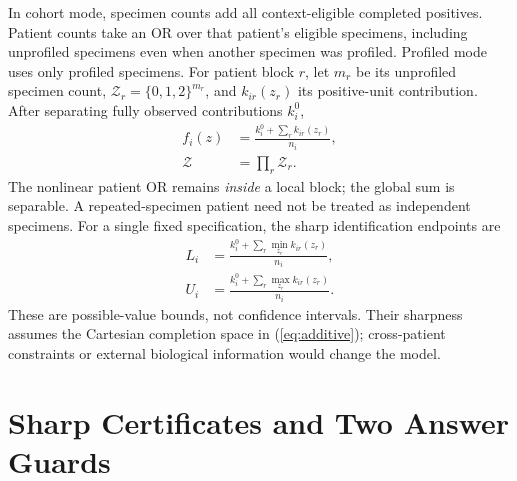 In cohort mode, specimen counts add all context-eligible completed positives. Patient counts take an OR over that patient's eligible specimens, including unprofiled specimens even when another specimen was profiled. Profiled mode uses only profiled specimens. For patient block $r$, let $m_r$ be its unprofiled specimen count, $\mathcal Z_r=\{0,1,2\}^{m_r}$, and $k_{ir}(z_r)$ its positive-unit contribution. After separating fully observed contributions $k_i^0$,
\begin{equation}
 \begin{aligned}
 f_i(z)&=\frac{k_i^0+\sum_r k_{ir}(z_r)}{n_i},\\
 \mathcal Z&=\prod_r\mathcal Z_r.
 \end{aligned}
\label{eq:additive}
\end{equation}
The nonlinear patient OR remains \emph{inside} a local block; the global sum is separable. A repeated-specimen patient need not be treated as independent specimens. For a single fixed specification, the sharp identification endpoints are
\begin{equation}
 \begin{aligned}
 L_i&=\frac{k_i^0+\sum_r\min_{z_r}k_{ir}(z_r)}{n_i},\\
 U_i&=\frac{k_i^0+\sum_r\max_{z_r}k_{ir}(z_r)}{n_i}.
 \end{aligned}
\label{eq:bounds}
\end{equation}
These are possible-value bounds, not confidence intervals. Their sharpness assumes the Cartesian completion space in (\ref{eq:additive}); cross-patient constraints or external biological information would change the model.

\section{Sharp Certificates and Two Answer Guards}
